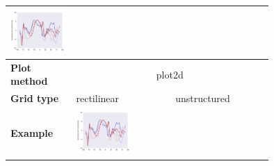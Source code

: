 \begin{refsection}
\begin{subappendices}
\begin{tabular}[c]{l|p{0.25\linewidth}|p{0.25\linewidth}|p{0.25\linewidth}|}
				\includegraphics[width=\linewidth, page=3]{psyplot-figures/psy-simple-demo.pdf} \\
			\midrule
			\midrule
			\textbf{Plot method} & \multicolumn{3}{c}{plot2d} \\
			\hline
			\textbf{Grid type} & rectilinear & \multicolumn{2}{c}{unstructured} \\
			\hline
			\textbf{Example} & 
				\includegraphics[width=\linewidth, page=4]{psyplot-figures/psy-simple-demo.pdf} &

\end{tabular}
\end{subappendices}
\end{refsection}
